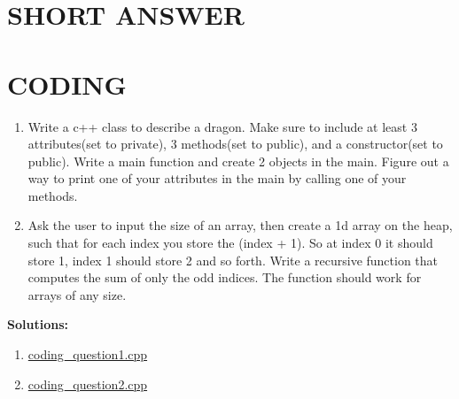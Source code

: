 \documentclass[a4paper]{article}
\begin{document}
\section{SHORT ANSWER}
\newpage


\section{CODING} 
\begin{enumerate}
    \item Write a c++ class to describe a dragon. Make sure to include at least 3 attributes(set to private),
    3 methods(set to public), and a constructor(set to public). Write a main function and create 2
    objects in the main. Figure out a way to print one of your attributes in the main by calling one of
    your methods.
    \item Ask the user to input the size of an array, then create a 1d array on the heap, such that for each
    index you store the (index + 1). So at index 0 it should store 1, index 1 should store 2 and so
    forth. Write a recursive function that computes the sum of only the odd indices. The function
    should work for arrays of any size.
\end{enumerate} 

\textbf{Solutions:}
\begin{enumerate}
  \item \href{run:./test_coding_question1.cpp}{coding\_question1.cpp}
  \item \href{run:./test_coding_question2.cpp}{coding\_question2.cpp} 
\end{enumerate}
\end{document}
